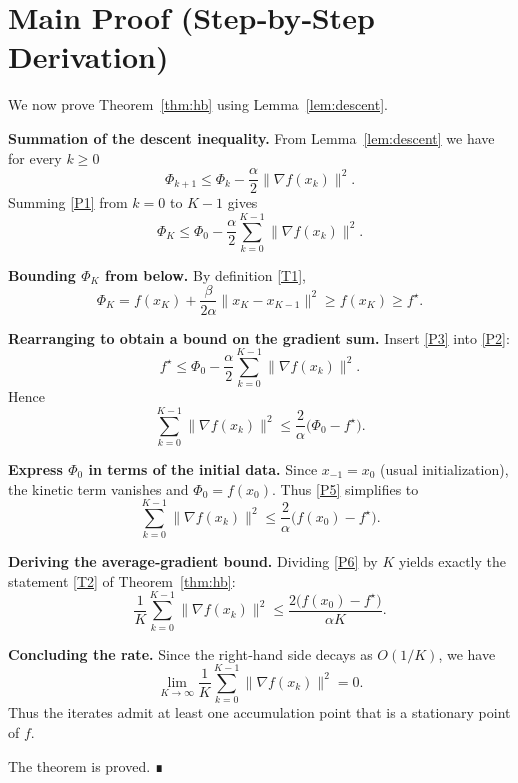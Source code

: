 \documentclass{article}
\begin{document}
\section*{Main Proof (Step‑by‑Step Derivation)}
We now prove Theorem~\ref{thm:hb} using Lemma~\ref{lem:descent}.

\begin{enumerate}[label={[\arabic*]},leftmargin=*]
\item \textbf{Summation of the descent inequality.}  
From Lemma~\ref{lem:descent} we have for every $k\ge0$
\[
\Phi_{k+1}\le\Phi_k-\frac{\alpha}{2}\|\nabla f(x_k)\|^2 .
\tag{P1}
\]
Summing \eqref{P1} from $k=0$ to $K-1$ gives
\[
\Phi_K\le\Phi_0-\frac{\alpha}{2}\sum_{k=0}^{K-1}\|\nabla f(x_k)\|^2 .
\tag{P2}
\]

\item \textbf{Bounding $\Phi_K$ from below.}  
By definition \eqref{T1},
\[
\Phi_K = f(x_K)+\frac{\beta}{2\alpha}\|x_K-x_{K-1}\|^2\ge f(x_K)\ge f^\star .
\tag{P3}
\]

\item \textbf{Rearranging to obtain a bound on the gradient sum.}  
Insert \eqref{P3} into \eqref{P2}:
\[
f^\star\le\Phi_0-\frac{\alpha}{2}\sum_{k=0}^{K-1}\|\nabla f(x_k)\|^2 .
\tag{P4}
\]
Hence
\[
\sum_{k=0}^{K-1}\|\nabla f(x_k)\|^2
\le\frac{2}{\alpha}\bigl(\Phi_0-f^\star\bigr).
\tag{P5}
\]

\item \textbf{Express $\Phi_0$ in terms of the initial data.}  
Since $x_{-1}=x_0$ (usual initialization), the kinetic term vanishes and $\Phi_0=f(x_0)$.  
Thus \eqref{P5} simplifies to
\[
\sum_{k=0}^{K-1}\|\nabla f(x_k)\|^2
\le\frac{2}{\alpha}\bigl(f(x_0)-f^\star\bigr).
\tag{P6}
\]

\item \textbf{Deriving the average‑gradient bound.}  
Dividing \eqref{P6} by $K$ yields exactly the statement \eqref{T2} of Theorem~\ref{thm:hb}:
\[
\frac{1}{K}\sum_{k=0}^{K-1}\|\nabla f(x_k)\|^2
\le\frac{2\bigl(f(x_0)-f^\star\bigr)}{\alpha K}.
\tag{P7}
\]

\item \textbf{Concluding the rate.}  
Since the right‑hand side decays as $O(1/K)$, we have
\[
\lim_{K\to\infty}\frac{1}{K}\sum_{k=0}^{K-1}\|\nabla f(x_k)\|^2 =0 .
\tag{P8}
\]
Thus the iterates admit at least one accumulation point that is a stationary point of $f$.
\end{enumerate}
The theorem is proved. ∎
\end{document}
